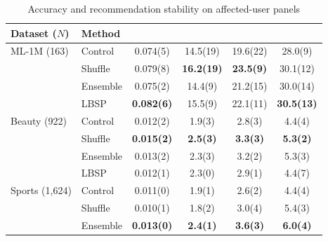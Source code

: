 \begin{table}[!htbp]
\centering
\caption{Accuracy and recommendation stability on affected-user panels}
\label{tab:four-methods}
\fontsize{8.5}{11}\selectfont
\setlength{\tabcolsep}{2.5pt}
\renewcommand{\arraystretch}{1.12}
\par\smallskip\noindent{}\par\smallskip
\noindent\begin{tabular*}{\textwidth}{@{\extracolsep{\fill}}llS[table-format=1.3(3)]S[table-format=2.1(3)]S[table-format=2.1(3)]S[table-format=2.1(3)]@{}}
\toprule
{Dataset ($N$)} & Method & {} & {} & {} & {}\\
\midrule
ML-1M (163) & Control & 0.074(5) & 14.5(19) & 19.6(22) & 28.0(9)\\ %
 & Shuffle & 0.079(8) & \bfseries 16.2(19) & \bfseries 23.5(9) & 30.1(12)\\ %
 & Ensemble & 0.075(2) & 14.4(9) & 21.2(15) & 30.0(14)\\ %
 & LBSP & \bfseries 0.082(6) & 15.5(9) & 22.1(11) & \bfseries 30.5(13)\\ %
\midrule
Beauty (922) & Control & 0.012(2) & 1.9(3) & 2.8(3) & 4.4(4)\\ %
 & Shuffle & \bfseries 0.015(2) & \bfseries 2.5(3) & \bfseries 3.3(3) & \bfseries 5.3(2)\\ %
 & Ensemble & 0.013(2) & 2.3(3) & 3.2(2) & 5.3(3)\\ %
 & LBSP & 0.012(1) & 2.3(0) & 2.9(1) & 4.4(7)\\ %
\midrule
Sports (1,624) & Control & 0.011(0) & 1.9(1) & 2.6(2) & 4.4(4)\\ %
 & Shuffle & 0.010(1) & 1.8(2) & 3.0(4) & 5.4(3)\\ %
 & Ensemble & \bfseries 0.013(0) & \bfseries 2.4(1) & \bfseries 3.6(3) & \bfseries 6.0(4)\\ %

\end{tabular*}
\end{table}
